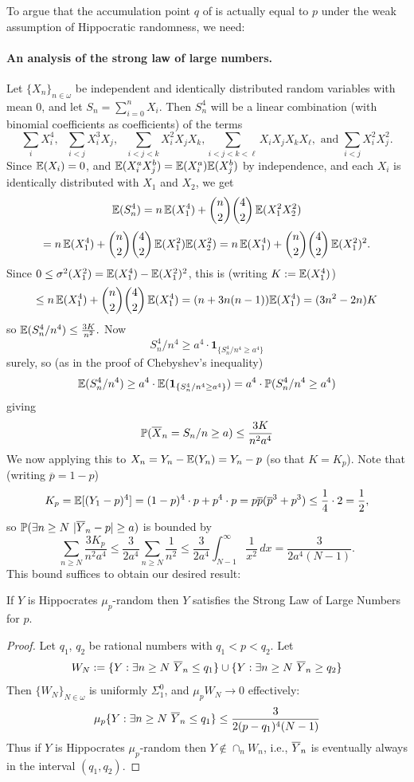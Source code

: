 To argue that the accumulation point $q$ of  is actually equal to $p$ under the weak assumption of Hippocratic randomness, we need: 
\paragraph{An analysis of the strong law of large numbers.} Let $\{X_n\}_{n\in\omega}$ be independent and identically distributed random variables with mean 0, and let $S_n=\sum_{i=0}^n X_i$. Then $S_n^4$ will be a linear combination (with binomial coefficients as coefficients) of the terms
\[
\sum_i X_i^4, \text{ }
\sum_{i<j} X^3_iX_j, \text{  }
\sum_{i<j<k} X_i^2 X_j X_k,
\sum_{i<j<k<\ell} X_i X_j X_k X_\ell, \text{ and } \sum_{i<j} X_i^2 X_j^2.
\]
Since $\mathbb{E}(X_i)=0$, and $\mathbb{E}(X_i^aX_j^b)=\mathbb{E}(X_i^a)\mathbb{E}(X_j^b)$ by independence, and each $X_i$ is identically distributed with $X_1$ and $X_2$, we get 
\[
\mathbb{E}(S_n^4) = n \,\mathbb{E}(X_1^4) + {n\choose 2}{4\choose 2} \,\mathbb{E}(X_1^2X_2^2)
\]
\[
= n \,\mathbb{E}(X_1^4) + {n\choose 2}{4\choose 2} \,\mathbb{E}(X_1^2)\mathbb{E}(X_2^2)
= n \,\mathbb{E}(X_1^4) + {n\choose 2}{4\choose 2} \,\mathbb{E}(X_1^2)^2.
\]
Since $0\le\sigma^2(X_1^2) = \mathbb{E}(X_1^4)-\mathbb{E}(X_1^2)^2$, this is (writing $K:=\mathbb{E}(X_1^4)$)
\[
\le  n \,\mathbb{E}(X_1^4) + {n\choose 2}{4\choose 2} \,\mathbb{E}(X_1^4) = (n+3n(n-1)) \mathbb{E}(X_1^4) = (3n^2-2n) K
\]
so 
$%
\E(S_n^4/n^4) \le \frac{3K}{n^2}.
$ %
 Now 
\[
S_n^4/n^4 \ge a^4 \cdot \mathbf 1_{\{S_n^4/n^4\ge a^4\}}
\]
surely, so (as in the proof of Chebyshev's inequality)
\[
\mathbb{E}(S_n^4/n^4) \ge a^4 \cdot \mathbb{E}(\mathbf 1_{\{S_n^4/n^4\ge a^4\}}) = a^4\cdot \mathbb{P}( S_n^4/n^4\ge a^4)
\]
giving
\[
\mathbb{P}(\overline X_n = S_n/n \ge a) \le \frac{3K}{n^2 a^{4}}
\]
We now applying this to $X_n=Y_n-\mathbb{E}(Y_n) = Y_n - p$ (so that $K=K_p$). Note that (writing $\overline p=1-p$)
\[
K_p=\mathbb{E}[(Y_1-p)^4] = (1-p)^4\cdot p + p^4\cdot p = p\overline p ({\overline p}^3+p^3) \le \frac{1}{4}\cdot 2 = \frac{1}{2},
\]
so $\mathbb{P}(\exists n\ge N\,\, |\overline Y_n-p|\ge a)$ is bounded by 
\[
\sum_{n\ge N} \frac{3K_p}{n^2 a^4} \le \frac{3}{2a^4} \sum_{n\ge N} \frac{1}{n^2}
\le \frac{3}{2a^4} \int_{N-1}^\infty \frac{1}{x^2}\,dx = \frac{3}{2a^4(N-1)}.
\]
This bound suffices to obtain our desired result:

\begin{theorem}\label{satisfy_LLN}
If $Y$ is Hippocrates $\mu_p$-random then $Y$ satisfies the Strong Law of Large Numbers for $p$.
\end{theorem}
\begin{proof}
Let $q_1$, $q_2$ be rational numbers with $q_1<p<q_2$.
Let
\[
W_N:=\{Y: \exists n\ge N\,\,\overline Y_n\le q_1\}\cup\{Y: \exists n\ge N\,\,\overline Y_n\ge q_2\}
\]
Then $\{W_N\}_{N\in\omega}$ is uniformly $\Sigma^0_1$, and $\mu_p W_N\to 0$ effectively:
\[\mu_p \{Y: \exists n\ge N\,\,\overline Y_n\le q_1\} \le \frac{3}{2(p-q_1)^4(N-1)}\]
Thus if $Y$ is Hippocrates $\mu_p$-random then $Y\not\in\cap_n W_n$, i.e., $\overline Y_n$ is eventually always in the interval $(q_1,q_2)$. 
\end{proof}



